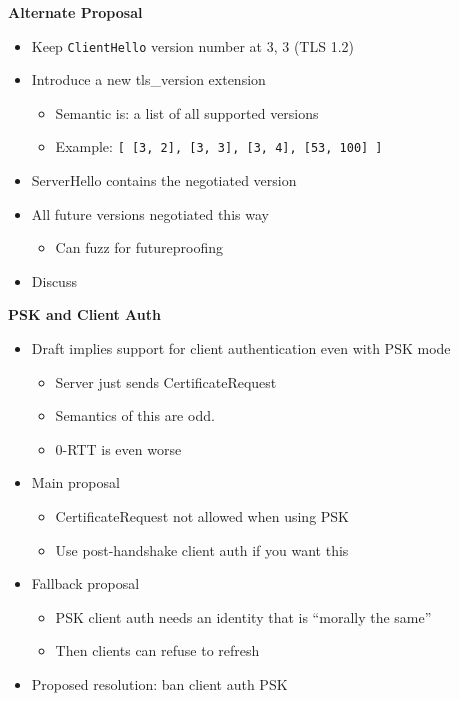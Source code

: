 \documentclass[helvetica]{seminar}
\newcommand{\heading}[1]{%
  \begin{center} 
    \large\bf 
    #1 
  \end{center} 
  \vspace{.4 in}}
\begin{document}
\begin{slide}
\heading{Alternate Proposal}

\begin{itemize}
\item Keep \verb^ClientHello^ version number at {3, 3} (TLS 1.2)

\item Introduce a new tls\_version extension
  \begin{itemize}
  \item Semantic is: a list of all supported versions
  \item Example: \verb^[ [3, 2], [3, 3], [3, 4], [53, 100] ]^
  \end{itemize}

\item ServerHello contains the negotiated version
\item All future versions negotiated this way
\begin{itemize}
\item Can fuzz for futureproofing
\end{itemize}

\item Discuss
\end{itemize}

\end{slide}


\begin{slide}
\heading{PSK and Client Auth}

\vspace{-4ex}
\begin{itemize}
\item Draft implies support for client authentication even with PSK mode
  \begin{itemize}
  \item Server just sends CertificateRequest
  \item Semantics of this are odd.
  \item 0-RTT is even worse
  \end{itemize}

\item Main proposal
  \begin{itemize}
  \item CertificateRequest not allowed when using PSK
  \item Use post-handshake client auth if you want this
  \end{itemize}

\item Fallback proposal
  \begin{itemize}
  \item PSK client auth needs an identity that is ``morally the same''
  \item Then clients can refuse to refresh
  \end{itemize}

\item Proposed resolution: ban client auth PSK
\end{itemize}

\end{slide}
\end{document}
